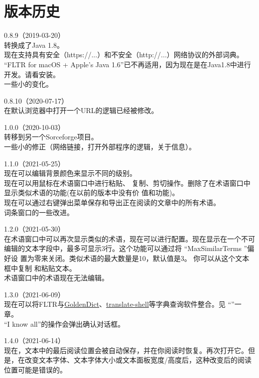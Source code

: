 \documentclass[cn,10pt,math=newtx,citestyle=gb7714-2015,bibstyle=gb7714-2015]{elegantbook}
\newcommand{\goldendict}{\href{http://goldendict.org/}{GoldenDict}}
\newcommand{\translateshell}{\href{https://github.com/soimort/translate-shell}{translate-shell}}
\begin{document}
\chapter{版本历史}
\label{版本历史}
0.8.9（2019-03-20）\\
转换成了Java 1.8。\\
现在支持具有安全（https://...）和不安全（http://...）网络协议的外部词典。\\
“FLTR for macOS + Apple's Java 1.6”已不再适用，因为现在是在Java1.8中进行开发。请看安装。\\
一些小的变化。

0.8.10（2020-07-17）\\
在默认浏览器中打开一个URL的逻辑已经被修改。

1.0.0（2020-10-03）\\
转移到另一个Sorceforge项目。\\
一些小的修正（网络链接，打开外部程序的逻辑，关于信息）。

1.1.0（2021-05-25）\\
现在可以编辑背景颜色来显示不同的级别。\\
现在可以用鼠标在术语窗口中进行粘贴、
复制、剪切操作。删除了在术语窗口中显示类似术语的功能(在以前的版本中没有价
值和功能)。\\
现在可以通过右键弹出菜单保存和导出正在阅读的文章中的所有术语。\\
词条窗口的一些改进。

1.2.0（2021-05-30）\\
在术语窗口中可以再次显示类似的术语，现在可以进行配置。现在显示在一个不可
编辑的文本字段中，最多可显示3行。这个功能可以通过将 “MaxSimilarTerms ”偏好设
置为零来关闭。类似术语的最大数量是10，默认值是3。 你可以从这个文本框中复制
和粘贴文本。\\
术语窗口中的术语现在无法编辑。

1.3.0（2021-06-09）\\
现在可以将FLTR与\goldendict 、\translateshell 等字典查询软件整合。见 “”一章。\\
“I know all”的操作会弹出确认对话框。

1.4.0（2021-06-14）\\
现在，文本中的最后阅读位置会被自动保存，并在你阅读时恢复。再次打开它。但是，在改变文本字体、文本字体大小或文本面板宽度/高度后，这种改变后的阅读位置可能是错误的。
\end{document}
